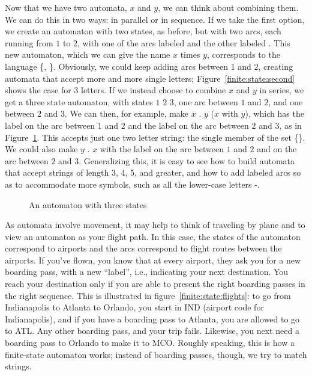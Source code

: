 \begin{underthehood}
Now that we have two automata, $x$ and $y$, we can think about
combining them. We can do this in two ways: in parallel or in
sequence. If we take the first option, we create an automaton with two
states, as before, but with two arcs, each running from $1$ to $2$,
with one of the arcs labeled  and the other labeled . This
new automaton, which we can give the name $x$ times $y$, corresponds
to the language \{, \}. Obviously, we could keep adding arcs
between $1$ and $2$, creating automata that accept more and more
single letters;
Figure~\ref{finite:state:second} shows the case for 3 letters. If we
instead choose to combine $x$ and $y$ in series, we get a three state
automaton, with states $1$ $2$ $3$, one arc between $1$ and $2$, and
one between $2$ and $3$.  We can then, for example, make $x$ . $y$ ($x$  with $y$),
which has the label  on the arc between $1$ and $2$ and the label
 on the arc between $2$ and $3$, as in
Figure~\ref{finite:state:fourth}.  This accepts just one two letter
string: the single member of the set \{\}.  We could also make
$y$ . $x$ with the label  on the arc between $1$ and $2$ and
 on the arc between $2$ and $3$.
Generalizing this, it is easy to see how to build automata that accept
strings of length 3, 4, 5, and greater, and how to add labeled arcs so
as to accommodate more symbols, such as all the lower-case letters
-.

\begin{figure}
    \caption{An automaton with three states}
    \label{finite:state:fourth}
\end{figure}

As automata involve movement, it may help to think of traveling by
plane and to view an automaton as your flight path.  In this case, the
states of the automaton correspond to airports and the arcs correspond
to flight routes between the airports.  If you've flown, you know that
at every airport, they ask you for a new boarding pass, with a new
``label'', i.e., indicating your next destination.  You reach your
destination only if you are able to present the right boarding passes
in the right sequence.  This is illustrated in
figure~\ref{finite:state:flights}: to go from Indianapolis to Atlanta
to Orlando, you start in IND (airport code for Indianapolis), and if
you have a boarding pass to Atlanta, you are allowed to go to ATL.
Any other boarding pass, and your trip fails.  Likewise, you next need
a boarding pass to Orlando to make it to MCO.  Roughly speaking, this
is how a finite-state automaton works; instead of boarding passes,
though, we try to match strings.


\end{underthehood}

